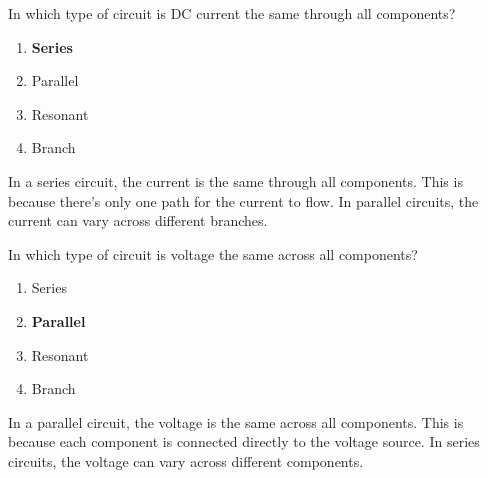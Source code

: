 \begin{tcolorbox}[colback=gray!10!white,colframe=black!75!black,title={T5D13}]
    In which type of circuit is DC current the same through all components?
    \begin{enumerate}[label=\Alph*),noitemsep]
        \item \textbf{Series}
        \item Parallel
        \item Resonant
        \item Branch
    \end{enumerate}
\end{tcolorbox}
In a series circuit, the current is the same through all components. This is because there’s only one path for the current to flow. In parallel circuits, the current can vary across different branches.

\begin{tcolorbox}[colback=gray!10!white,colframe=black!75!black,title={T5D14}]
    In which type of circuit is voltage the same across all components?
    \begin{enumerate}[label=\Alph*),noitemsep]
        \item Series
        \item \textbf{Parallel}
        \item Resonant
        \item Branch
    \end{enumerate}
\end{tcolorbox}
In a parallel circuit, the voltage is the same across all components. This is because each component is connected directly to the voltage source. In series circuits, the voltage can vary across different components.
